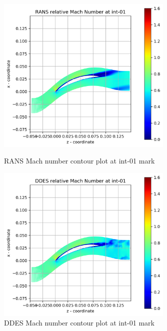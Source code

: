\begin{figure}[ht]
  \centering
%  

  \includegraphics[width=0.75\textwidth]{Pictures/rans-mach-int-01.png}
  \caption{RANS Mach number contour plot at int-01 mark} \label{int-01-rans-mach}
  
   \vspace*{\floatsep}%
   
  \includegraphics[width=0.75\textwidth]{Pictures/ddes-mach-int-01.png}
  \caption{DDES Mach number contour plot at int-01 mark} \label{int-01-ddes-mach}
\end{figure}

